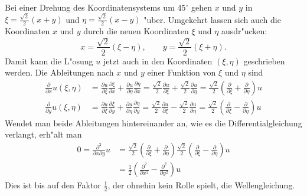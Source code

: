 {\begin{loesung}
\begin{teilaufgaben}
Bei einer Drehung des Koordinatensystems um $45^\circ$ gehen
$x$ und $y$ in $\xi=\frac{\sqrt{2}}2(x+y)$ und $\eta=\frac{\sqrt{2}}2(x-y)$
"uber. Umgekehrt lassen sich auch die Koordinaten $x$ und $y$ durch
die neuen Koordinaten $\xi$ und $\eta$ ausdr"ucken:
\[
x=\frac{\sqrt{2}}2(\xi-\eta),\qquad y=\frac{\sqrt{2}}2(\xi+\eta).
\]
Damit kann die L"osung $u$ jetzt auch in den Koordinaten $(\xi,\eta)$
geschrieben werden. Die Ableitungen nach $x$ und $y$
einer Funktion von $\xi$
und $\eta$ sind
\begin{align*}
\frac{\partial}{\partial x}u(\xi,\eta)
&=
\frac{\partial u}{\partial \xi}\frac{\partial \xi}{\partial x}
+
\frac{\partial u}{\partial \eta}\frac{\partial \eta}{\partial x}
=
\frac{\sqrt{2}}2\frac{\partial u}{\partial\xi}
+\frac{\sqrt{2}}2\frac{\partial u}{\partial\eta}
=
\frac{\sqrt{2}}2\left(\frac{\partial}{\partial \xi}+\frac{\partial}{\partial\eta}\right)u
\\
\frac{\partial}{\partial y}u(\xi,\eta)
&=
\frac{\partial u}{\partial \xi}\frac{\partial \xi}{\partial y}
+
\frac{\partial u}{\partial \eta}\frac{\partial \eta}{\partial y}
=
\frac{\sqrt{2}}2\frac{\partial u}{\partial\xi}
-\frac{\sqrt{2}}2\frac{\partial u}{\partial\eta}
=
\frac{\sqrt{2}}2\left(\frac{\partial}{\partial \xi}-\frac{\partial}{\partial\eta}\right)u
\end{align*}
Wendet man beide Ableitungen hintereinander an, wie es die
Differentialgleichung verlangt, erh"alt man
\begin{align*}
0=\frac{\partial^2}{\partial x\partial y}u
&=
\frac{\sqrt{2}}2
\left(\frac{\partial}{\partial \xi}+\frac{\partial}{\partial\eta}\right)
\frac{\sqrt{2}}2
\left(\frac{\partial}{\partial \xi}-\frac{\partial}{\partial\eta}\right)u
\\
&=
\frac12
\left(
\frac{\partial^2}{\partial x^2}-\frac{\partial^2}{\partial y^2}
\right)u
\end{align*}
Dies ist bis auf den Faktor $\frac12$, der ohnehin kein Rolle spielt,
die Wellengleichung.
\end{teilaufgaben}
\end{loesung}
}{}

